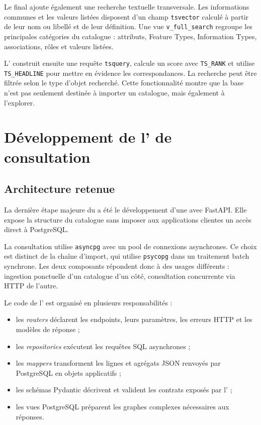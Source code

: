 Le  final ajoute également une recherche textuelle transversale. Les informations communes et les valeurs listées disposent d'un champ \texttt{tsvector} calculé à partir de leur nom ou libellé et de leur définition. Une vue \texttt{v\_full\_search} regroupe les principales catégories du catalogue : attributs, Feature Types, Information Types, associations, rôles et valeurs listées.

L' construit ensuite une requête \texttt{tsquery}, calcule un score avec \texttt{TS\_RANK} et utilise \texttt{TS\_HEADLINE} pour mettre en évidence les correspondances. La recherche peut être filtrée selon le type d'objet recherché. Cette fonctionnalité montre que la base n'est pas seulement destinée à importer un catalogue, mais également à l'explorer.

\section{Développement de l'  de consultation}

\subsection{Architecture retenue}

La dernière étape majeure du  a été le développement d'une   avec FastAPI. Elle expose la structure du catalogue sans imposer aux applications clientes un accès direct à PostgreSQL.

La consultation utilise \texttt{asyncpg} avec un pool de connexions asynchrones. Ce choix est distinct de la chaîne d'import, qui utilise \texttt{psycopg} dans un traitement batch synchrone. Les deux composants répondent donc à des usages différents : ingestion ponctuelle d'un catalogue d'un côté, consultation concurrente via HTTP de l'autre.

Le code de l' est organisé en plusieurs responsabilités :

\begin{itemize}
    \item les \textit{routers} déclarent les endpoints, leurs paramètres, les erreurs HTTP et les modèles de réponse ;
    \item les \textit{repositories} exécutent les requêtes SQL asynchrones ;
    \item les \textit{mappers} transforment les lignes et agrégats JSON renvoyés par PostgreSQL en objets applicatifs ;
    \item les schémas Pydantic décrivent et valident les contrats exposés par l' ;
    \item les vues PostgreSQL préparent les graphes complexes nécessaires aux réponses.
\end{itemize}

